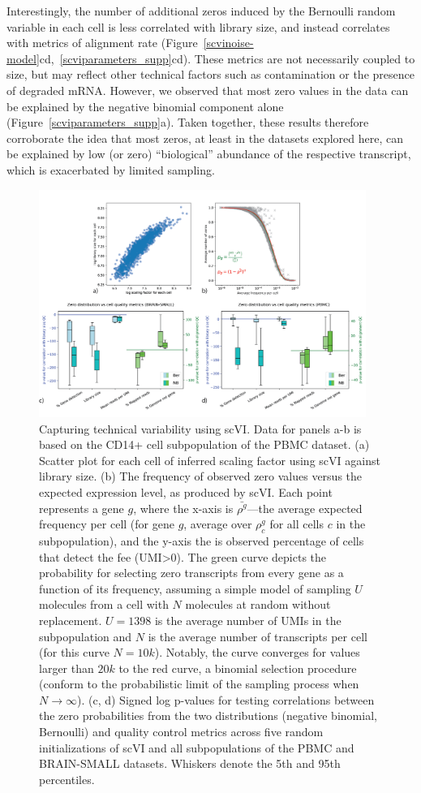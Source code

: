 Interestingly, the number of additional zeros induced by the Bernoulli random variable in each cell is less correlated with library size, and instead correlates with metrics of alignment rate (Figure~\ref{scvinoise-model}cd,~\ref{scviparameters_supp}cd). These metrics are not necessarily coupled to size, but may reflect other technical factors such as contamination or the presence of degraded mRNA. However, we observed that most zero values in the data can be explained by the negative binomial component alone (Figure~\ref{scviparameters_supp}a). Taken together, these results therefore corroborate the idea that most zeros, at least in the datasets explored here, can be explained by low (or zero) ``biological'' abundance of the respective transcript, which is exacerbated by limited sampling. 


\begin{figure}
\centering
\includegraphics[width=0.95\textwidth]{figures/Figure-6.png}
\caption[Capturing technical variability using scVI]{Capturing technical variability using scVI. Data for panels a-b is based on the CD14+ cell subpopulation of the PBMC dataset. (a) Scatter plot for each cell of inferred scaling factor using scVI against library size. 
(b) The frequency of observed zero values versus the expected expression level, as produced by scVI. Each point represents a gene $g$, where the x-axis is $\bar{\rho^g}$---the average expected frequency per cell (for gene $g$, average over $\rho_c^g$ for all cells $c$ in the subpopulation), and the y-axis the is observed percentage of cells that detect the fee (UMI>0). The green curve depicts the probability for selecting zero transcripts from every gene as a function of its frequency, assuming a simple model of sampling $U$ molecules from a cell with $N$ molecules at random without replacement. $U=1398$ is the average number of UMIs in the subpopulation and $N$ is the average number of transcripts per cell (for this curve $N=10k$). Notably, the curve converges for values larger than $20k$ to the red curve, a binomial selection procedure (conform to the probabilistic limit of the sampling process when $N\rightarrow \infty$). (c, d) Signed log p-values for testing correlations between the zero probabilities from the two distributions (negative binomial, Bernoulli) and quality control metrics across five random initializations of scVI and all subpopulations of the PBMC and BRAIN-SMALL datasets. Whiskers denote the 5th and 95th percentiles.}

\end{figure}
